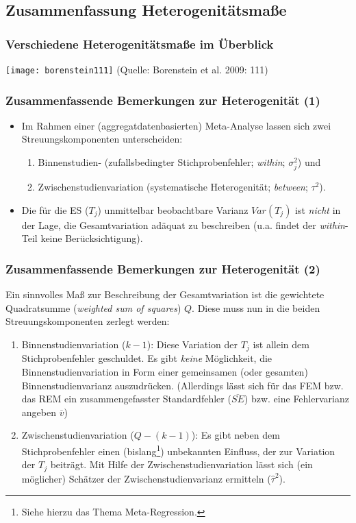 \subsection{Zusammenfassung Heterogenitätsmaße}

\begin{frame}[shrink = 5]
  \frametitle{Verschiedene Heterogenitätsmaße im Überblick}
  \texttt{[image: borenstein111]}
\newline(Quelle: Borenstein et al. 2009: 111)
\end{frame}


\begin{frame}
  \frametitle{Zusammenfassende Bemerkungen zur Heterogenität (1)}
  \begin{itemize}
  \item Im Rahmen einer (aggregatdatenbasierten) Meta-Analyse lassen sich zwei
    Streuungskomponenten unterscheiden:
    \begin{enumerate}
    \item Binnenstudien- (zufallsbedingter Stichprobenfehler; \emph{within};
      $\sigma_j^2$) und
    \item Zwischenstudienvariation (systematische Heterogenität; \emph{between};
      $\tau^2$).
    \end{enumerate}
  \item Die für die ES ($T_j$) unmittelbar beobachtbare Varianz
    $Var(T_j)$ ist \emph{nicht} in der Lage, die Gesamtvariation adäquat zu
    beschreiben (u.a. findet der \emph{within}-Teil keine Berücksichtigung).
  \end{itemize}
\end{frame}


\begin{frame}
  \frametitle{Zusammenfassende Bemerkungen zur Heterogenität (2)}
  \begin{small}
    Ein sinnvolles Maß zur Beschreibung der Gesamtvariation ist die gewichtete
    Quadratsumme (\emph{weighted sum of squares}) $Q$. Diese muss nun in die
    beiden Streuungskomponenten zerlegt werden:
    \begin{enumerate}
    \item Binnenstudienvariation ($k-1$): Diese Variation der $T_j$ ist allein
      dem Stichprobenfehler geschuldet. Es gibt \emph{keine} Möglichkeit, die
      Binnenstudienvariation in Form einer gemeinsamen (oder gesamten)
      Binnenstudienvarianz auszudrücken. (Allerdings lässt sich für das FEM
      bzw. das REM ein zusammengefasster Standardfehler ($\overline{SE}$)
      bzw. eine Fehlervarianz angeben $\overline{v}$)
    \item Zwischenstudienvariation ($Q-(k-1)$): Es gibt neben dem
      Stichprobenfehler einen (bislang\footnote{Siehe hierzu das Thema
        Meta-Regression.}) unbekannten Einfluss, der zur Variation der $T_j$
      beiträgt. Mit Hilfe der Zwischenstudienvariation lässt sich (ein
      möglicher) Schätzer der Zwischenstudienvarianz ermitteln
      ($\widehat{\tau}^2$).
    \end{enumerate}
  \end{small}
  \end{frame}


